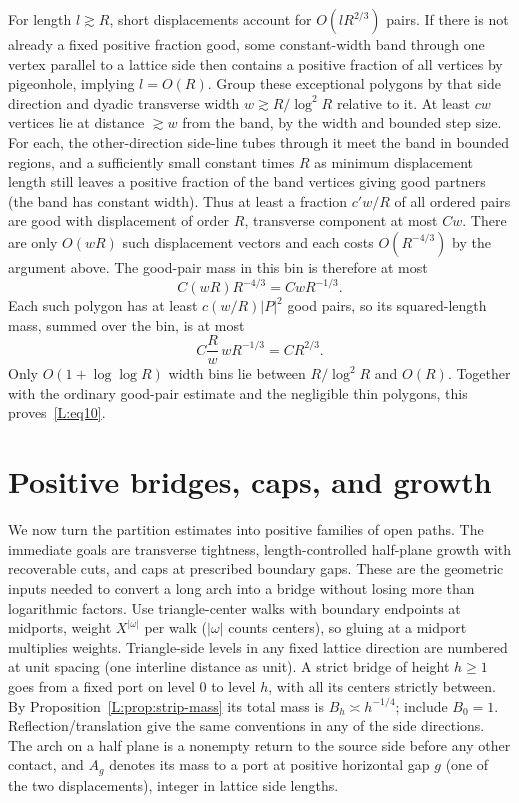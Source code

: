 \documentclass[11pt]{article}
\numberwithin{equation}{section}
\theoremstyle{definition}\newtheorem{definition}[theorem]{Definition}
\theoremstyle{remark}\newtheorem{remark}[theorem]{Remark}
\begin{document}
For length \(l\gtrsim R\), short displacements account for \(O(lR^{2/3})\) pairs. If there is not already a fixed positive fraction good, some constant-width band through one vertex parallel to a lattice side then contains a positive fraction of all vertices by pigeonhole, implying \(l=O(R)\). Group these exceptional polygons by that side direction and dyadic transverse width \(w\gtrsim R/\log^2R\) relative to it. At least \(c w\) vertices lie at distance \(\gtrsim w\) from the band, by the width and bounded step size. For each, the other-direction side-line tubes through it meet the band in bounded regions, and a sufficiently small constant times \(R\) as minimum displacement length still leaves a positive fraction of the band vertices giving good partners (the band has constant width). Thus at least a fraction \(c' w/R\) of all ordered pairs are good with displacement of order \(R\), transverse component at most \(Cw\). There are only \(O(wR)\) such displacement vectors and each costs \(O(R^{-4/3})\) by the argument above. The good-pair mass in this bin is therefore at most
\[
 C(wR)R^{-4/3}=CwR^{-1/3}.
\]
Each such polygon has at least $c(w/R)|P|^2$ good pairs, so its
squared-length mass, summed over the bin, is at most
\[
 C\frac{R}{w}\,wR^{-1/3}=CR^{2/3}.
\]
Only $O(1+\log\log R)$ width bins lie between $R/\log^2R$ and $O(R)$.
Together with the ordinary good-pair estimate and the negligible thin
polygons, this proves~\eqref{L:eq10}.


\section{Positive bridges, caps, and growth}\label{L:part10}

We now turn the partition estimates into positive families of open paths. The immediate goals are transverse tightness, length-controlled half-plane growth with recoverable cuts, and caps at prescribed boundary gaps. These are the geometric inputs needed to convert a long arch into a bridge without losing more than logarithmic factors. Use triangle-center walks with boundary endpoints at midports, weight \(X^{|\omega|}\) per walk (\(|\omega|\) counts centers), so gluing at a midport multiplies weights. Triangle-side levels in any fixed lattice direction are numbered at unit spacing (one interline distance as unit). A strict bridge of height \(h\ge1\) goes from a fixed port on level 0 to level \(h\), with all its centers strictly between. By Proposition~\ref{L:prop:strip-mass} its total mass is \(B_h\asymp h^{-1/4}\); include \(B_0=1\). Reflection/translation give the same conventions in any of the side directions. The arch on a half plane is a nonempty return to the source side before any other contact, and \(A_g\) denotes its mass to a port at positive horizontal gap \(g\) (one of the two displacements), integer in lattice side lengths.
\end{document}
